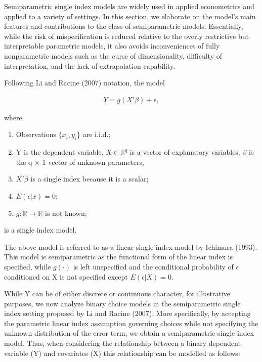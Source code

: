 \documentclass[a4paper]{article}
\begin{document}
Semiparametric single index models are widely used in applied econometrics and applied to a variety of settings.
In this section, we elaborate on the model's main features and contributions to the class of semiparametric models.  
Essentially, while the risk of mispecification is reduced relative to the overly restrictive but interpretable parametric models, it also avoids inconveniences of fully nonparametric models such as the curse of dimensionality, difficulty of interpretation, and the lack of extrapolation capability.

\vspace{2mm} 
Following Li and Racine (2007) notation, the model
 
\begin{eqnarray}
Y = g(X'\beta) + \epsilon,  %
\end{eqnarray}

where

\begin{enumerate}
		\item Observations $\{x_i,y_i\}$ are i.i.d.;
		\item Y is the dependent variable, $X\in \mathbb{R}^{q}$ is a vector of explanatory variables, $\beta$ is the q $\times$ 1 vector of unknown parameters; %
	\item $X'\beta$ is a single index because it is a scalar;
	\item $ E(\epsilon|x) = 0 $;
	\item $g: \mathbb{R} \rightarrow \mathbb{R} $ is not known; %
\end{enumerate}

is a single index model.
\vspace{2mm}

The above model is referred to as a linear single index model by Ichimura (1993). This model is semiparametric as the functional form of the linear index is specified, while $g(\cdot)$ is left unspecified and the conditional probability of $\epsilon$ conditioned on X is not specified except $ E(\epsilon|X) = 0 $. 

While Y can be of either discrete or continuous character, for illustrative purposes, we now analyze binary choice models in the semiparametric single index setting proposed by Li and Racine (2007). More specifically, by accepting the parametric linear index assumption governing choices while not specifying the unknown distribution of the error term, we obtain a semiparametric single index model. Thus, when considering the relationship between a binary dependent variable (Y) and covariates (X) this relationship can be modelled as follows:
\end{document}
